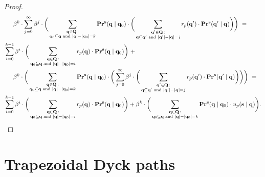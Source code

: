 \begin{proof}
\begin{align*}
& \hspace{15pt} \beta^k \cdot \sum_{j=0}^{\infty}\beta^{j} \cdot  \bigg(
\sum_{\substack{\mathbf{q} \in \mathbf{Q} \,: \\ \mathbf{q}_0 \subseteq \mathbf{q} \text{ {\rm and} } |\mathbf{q}| - |\mathbf{q}_0| = k}} \mathbf{Pr}^{\mathbf{s}}(\mathbf{q} \mid \mathbf{q}_0) \cdot
\bigg(\sum_{\substack{\mathbf{q}' \in \mathbf{Q} \,: \\ \mathbf{q} \subseteq \mathbf{q}' \text{ {\rm and} } |\mathbf{q}'| - |\mathbf{q}| = j}} r_p(\mathbf{q}') \cdot 
\mathbf{Pr}^{\mathbf{s}}(\mathbf{q}' \mid \mathbf{q})\bigg)\bigg)\ = \\
& \sum_{i=0}^{k-1} \beta^i \cdot \bigg(\sum_{\substack{\mathbf{q} \in \mathbf{Q} \,: \\ \mathbf{q}_0 \subseteq \mathbf{q} \text{ {\rm and} } |\mathbf{q}| - |\mathbf{q}_0| = i}} r_p(\mathbf{q}) \cdot \mathbf{Pr}^{\mathbf{s}}(\mathbf{q} \mid \mathbf{q}_0)\bigg) \ + \\
& \hspace{15pt}
 \beta^k \cdot \bigg(\sum_{\substack{\mathbf{q} \in \mathbf{Q} \,: \\ \mathbf{q}_0 \subseteq \mathbf{q} \text{ {\rm and} } |\mathbf{q}| - |\mathbf{q}_0| = k}} \mathbf{Pr}^{\mathbf{s}}(\mathbf{q} \mid \mathbf{q}_0) \cdot \bigg(\sum_{j=0}^{\infty}\beta^{j} \cdot  \bigg(\sum_{\substack{\mathbf{q}' \in \mathbf{Q} \,: \\ \mathbf{q} \subseteq \mathbf{q}' \text{ {\rm and} } |\mathbf{q}'| - |\mathbf{q}| = j}} r_p(\mathbf{q}') \cdot 
\mathbf{Pr}^{\mathbf{s}}(\mathbf{q}' \mid \mathbf{q})\bigg)\bigg)\bigg)\ = \\
& \sum_{i=0}^{k-1} \beta^i \cdot \bigg(\sum_{\substack{\mathbf{q} \in \mathbf{Q} \,: \\ \mathbf{q}_0 \subseteq \mathbf{q} \text{ {\rm and} } |\mathbf{q}| - |\mathbf{q}_0| = i}} r_p(\mathbf{q}) \cdot \mathbf{Pr}^{\mathbf{s}}(\mathbf{q} \mid \mathbf{q}_0)\bigg) +  \beta^k \cdot 
\bigg(\sum_{\substack{\mathbf{q} \in \mathbf{Q} \,: \\ \mathbf{q}_0 \subseteq \mathbf{q} \text{ {\rm and} } |\mathbf{q}| - |\mathbf{q}_0| = k}}
\mathbf{Pr}^{\mathbf{s}}(\mathbf{q} \mid \mathbf{q}_0) \cdot u_p(\mathbf{s} \mid \mathbf{q})\bigg).
\end{align*}
\end{proof}

\section{Trapezoidal Dyck paths}
\label{appendix-trapezoid}

